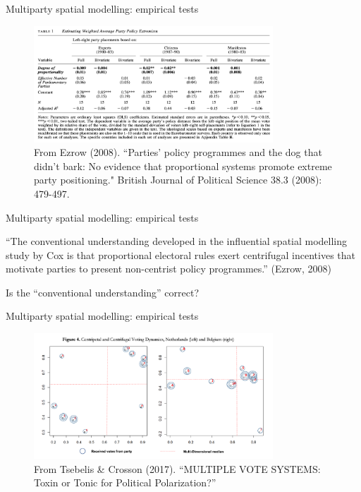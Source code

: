 \documentclass[11pt,aspectratio=169]{beamer}
\begin{document}
\begin{frame}{Multiparty spatial modelling: empirical tests}

\begin{figure}
\centering
\includegraphics[width=0.8\textwidth]{reg.png}
\caption{From Ezrow (2008). ``Parties' policy programmes and the dog that didn't bark: No evidence that proportional systems promote extreme party positioning." British Journal of Political Science 38.3 (2008): 479-497.}
\end{figure}

\end{frame}
\begin{frame}{Multiparty spatial modelling: empirical tests}

``The conventional understanding developed in the influential spatial modelling study by Cox is that proportional electoral rules exert centrifugal incentives that motivate parties to present non-centrist policy programmes.'' (Ezrow, 2008)

\pause 
\vspace{2em}

\begin{tcolorbox}
Is the ``conventional understanding'' correct?
\end{tcolorbox}

\end{frame}
\begin{frame}{Multiparty spatial modelling: empirical tests}

\begin{figure}
\centering
\includegraphics[width=0.8\textwidth]{crosson.png}
\caption{From Tsebelis \& Crosson (2017). ``MULTIPLE VOTE SYSTEMS: Toxin or Tonic for Political Polarization?''}
\end{figure}

\end{frame}
\end{document}
